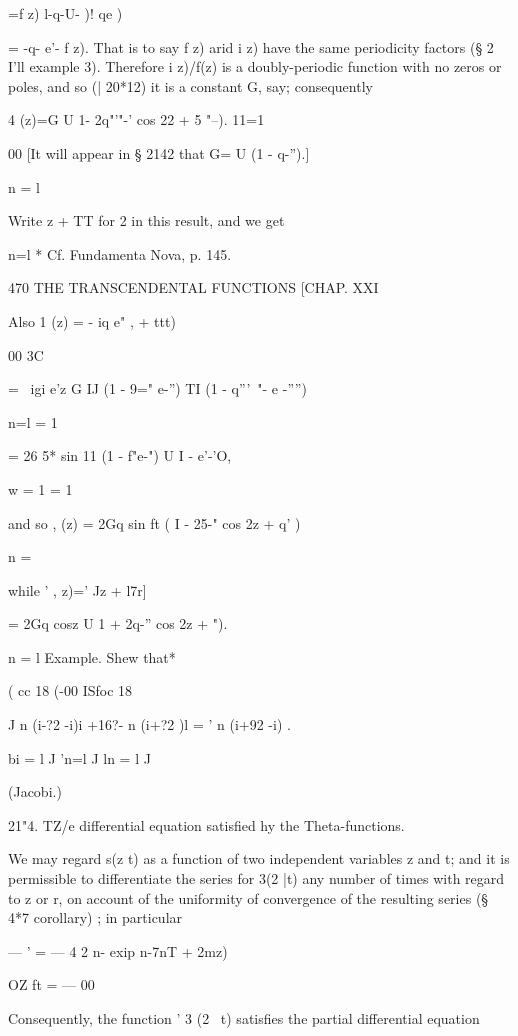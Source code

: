 =f z) l-q-U- )!  qe  ) 

= -q- e'- f z). 
That is to say f z) arid  i z) have the same periodicity factors (§ 2 I'll 
example 3). Therefore  i z)/f(z) is a doubly-periodic function with no 
zeros or poles, and so (| 20*12) it is a constant G, say; consequently 

 4 (z)=G U  1- 2q"'"-' cos 22 + 5 "--). 
11=1 

00 
[It will appear in § 2142 that G= U (1 - q-'').] 

n = l 

Write z +  TT for 2  in this result, and we get 


n=l 
* Cf. Fundamenta Nova, p. 145. 



470 THE TRANSCENDENTAL FUNCTIONS [CHAP. XXI 

Also  1 (z) = - iq  e"  ,   +   ttt) 

00 3C 

= \  igi e'z G IJ (1 - 9=" e-'') TI (1 - q'''~"- e -'''') 

n=l   = 1 

= 26 5* sin   11 (1 - f"e-") U  I -  e'-'O, 

w = 1   = 1 

and so  , (z) = 2Gq  sin   ft ( I - 25-" cos 2z + q' ) 

n = \ 

while ' , z)=' Jz + l7r] 

= 2Gq  cosz U  1 + 2q-'' cos 2z +  "). 

n = l 
Example. Shew that* 

( cc 18 (-00 ISfoc 18 

J n (i-?2 -i)i +16?- n (i+?2 )l = ' n (i+92 -i)  . 

bi = l J 'n=l J ln = l J 

(Jacobi.) 

21"4. TZ/e differential equation satisfied hy the Theta-functions. 

We may regard  s(z t) as a function of two independent variables z 
and t; and it is permissible to differentiate the series for  3(2 |t) any 
number of times with regard to z or r, on account of the uniformity of 
convergence of the resulting series (§ 4*7 corollary) ; in particular 

—   '   = — 4 2 n- exip n-7nT + 2mz) 

OZ ft = — 00 

Consequently, the function ' 3 (2 \ t) satisfies the partial differential equation 

